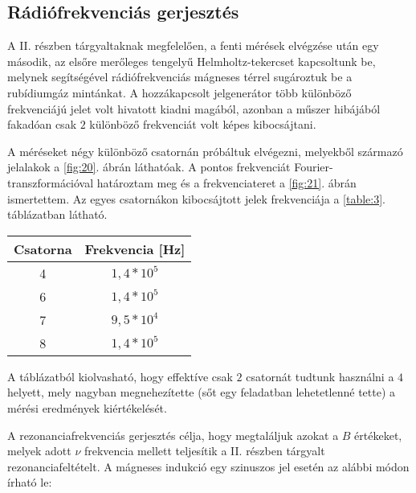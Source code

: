 \begin{multicols}{2}
\section{Rádiófrekvenciás gerjesztés}
A II. részben tárgyaltaknak megfelelően, a fenti mérések elvégzése után egy második, az elsőre merőleges tengelyű Helmholtz-tekercset kapcsoltunk be, melynek segítségével rádiófrekvenciás mágneses térrel sugároztuk be a rubídiumgáz mintánkat. A hozzákapcsolt jelgenerátor több különböző frekvenciájú jelet volt hivatott kiadni magából, azonban a műszer hibájából fakadóan csak $2$ különböző frekvenciát volt képes kibocsájtani. \par
A méréseket négy különböző csatornán próbáltuk elvégezni, melyekből származó jelalakok a \ref{fig:20}. ábrán láthatóak. A pontos frekvenciát Fourier-transzformációval határoztam meg és a frekvenciateret a \ref{fig:21}. ábrán ismertettem. Az egyes csatornákon kibocsájtott jelek frekvenciája a \ref{table:3}. táblázatban látható.

\begin{center}
\begin{tabular}{|c|c|}
\hline
Csatorna & Frekvencia [Hz] \\ \hline \hline
4        & $1,4 * 10^{5}$  \\ \hline
6        & $1,4 * 10^{5}$  \\ \hline
7        & $9,5 * 10^{4}$  \\ \hline
8        & $1,4 * 10^{5}$  \\ \hline
\end{tabular}
 \label{table:3}
\end{center}
A táblázatból kiolvasható, hogy effektíve csak $2$ csatornát tudtunk használni a $4$ helyett, mely nagyban megnehezítette (sőt egy feladatban lehetetlenné tette) a mérési eredmények kiértékelését. \par
A rezonanciafrekvenciás gerjesztés célja, hogy megtaláljuk azokat a $B$ értékeket, melyek adott $\nu$ frekvencia mellett teljesítik a II. részben tárgyalt rezonanciafeltételt. A mágneses indukció egy szinuszos jel esetén az alábbi módon írható le:


\end{multicols}
